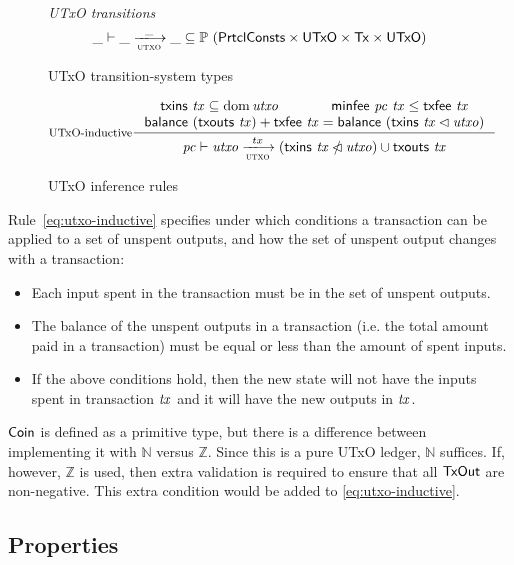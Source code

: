 \documentclass[11pt,a4paper]{article}
\newcommand{\Tx}{\type{Tx}}
\newcommand{\UTxO}{\type{UTxO}}
\newcommand{\Coin}{\type{Coin}}
\newcommand{\PrtclConsts}{\type{PrtclConsts}}
\newcommand{\TxOut}{\type{TxOut}}
\newcommand{\txins}[1]{\fun{txins}~ \var{#1}}
\newcommand{\txouts}[1]{\fun{txouts}~ \var{#1}}
\newcommand{\balance}[1]{\fun{balance}~ \var{#1}}
\newcommand{\txfee}[1]{\fun{txfee}~ \var{#1}}
\newcommand{\minfee}[2]{\fun{minfee}~ \var{#1}~ \var{#2}}
\begin{document}
\begin{figure}
  \emph{UTxO transitions}
  \begin{equation*}
    \_ \vdash
    \var{\_} \trans{utxo}{\_} \var{\_}
    \subseteq \powerset (\PrtclConsts \times \UTxO \times \Tx \times \UTxO)
  \end{equation*}
  \caption{UTxO transition-system types}
  \label{fig:ts-types:utxo}
\end{figure}

\begin{figure}
  \begin{equation}\label{eq:utxo-inductive}
    \inference[UTxO-inductive]
    { \txins{tx} \subseteq \dom \var{utxo} & \minfee{pc}{tx} \leq \txfee{tx}\\
      \balance{(\txouts{tx})}  + \txfee{tx} =
        \balance{(\txins{tx} \restrictdom \var{utxo})}
    }
    {\var{pc} \vdash \var{utxo} \trans{utxo}{tx}
      (\txins{tx} \subtractdom \var{utxo}) \cup \txouts{tx}
    }
  \end{equation}
  \caption{UTxO inference rules}
  \label{fig:rules:utxo}
\end{figure}

Rule~\ref{eq:utxo-inductive} specifies under which conditions a transaction can
be applied to a set of unspent outputs, and how the set of unspent output
changes with a transaction:
\begin{itemize}
\item Each input spent in the transaction must be in the set of unspent
  outputs.
\item The balance of the unspent outputs in a transaction (i.e. the total
  amount paid in a transaction) must be equal or less than the amount of spent
  inputs.
\item If the above conditions hold, then the new state will not have the inputs
  spent in transaction $\mathit{tx}$ and it will have the new outputs in
  $\mathit{tx}$.
\end{itemize}

\begin{note}
  $\Coin$ is defined as a primitive type, but there is a difference
  between implementing it with $\mathbb{N}$ versus $\mathbb{Z}$.
  Since this is a pure UTxO ledger, $\mathbb{N}$ suffices.
  If, however, $\mathbb{Z}$ is used, then extra validation is required
  to ensure that all $\TxOut$ are non-negative.
  This extra condition would be added to \cref{eq:utxo-inductive}.
\end{note}

\subsection{Properties}
\label{sec:utxo-properties}
\end{document}
